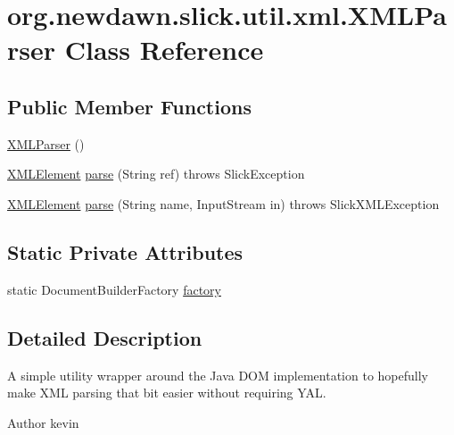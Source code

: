 \hypertarget{classorg_1_1newdawn_1_1slick_1_1util_1_1xml_1_1_x_m_l_parser}{}\section{org.\+newdawn.\+slick.\+util.\+xml.\+X\+M\+L\+Parser Class Reference}
\label{classorg_1_1newdawn_1_1slick_1_1util_1_1xml_1_1_x_m_l_parser}
\subsection*{Public Member Functions}
\begin{DoxyCompactItemize}
\item 
\mbox{\hyperlink{classorg_1_1newdawn_1_1slick_1_1util_1_1xml_1_1_x_m_l_parser_a560517a420b742fbdcef4565eb618f5c}{X\+M\+L\+Parser}} ()
\item 
\mbox{\hyperlink{classorg_1_1newdawn_1_1slick_1_1util_1_1xml_1_1_x_m_l_element}{X\+M\+L\+Element}} \mbox{\hyperlink{classorg_1_1newdawn_1_1slick_1_1util_1_1xml_1_1_x_m_l_parser_a24c99740f08e3fe6d427aa9b478a01ba}{parse}} (String ref)  throws Slick\+Exception 
\item 
\mbox{\hyperlink{classorg_1_1newdawn_1_1slick_1_1util_1_1xml_1_1_x_m_l_element}{X\+M\+L\+Element}} \mbox{\hyperlink{classorg_1_1newdawn_1_1slick_1_1util_1_1xml_1_1_x_m_l_parser_ad6cf0561a3b5afa18f67a670d8f335ae}{parse}} (String name, Input\+Stream in)  throws Slick\+X\+M\+L\+Exception 
\end{DoxyCompactItemize}
\subsection*{Static Private Attributes}
\begin{DoxyCompactItemize}
\item 
static Document\+Builder\+Factory \mbox{\hyperlink{classorg_1_1newdawn_1_1slick_1_1util_1_1xml_1_1_x_m_l_parser_add3e50cbc880252b74c5e60d886d32ac}{factory}}
\end{DoxyCompactItemize}


\subsection{Detailed Description}
A simple utility wrapper around the Java D\+OM implementation to hopefully make X\+ML parsing that bit easier without requiring Y\+AL.

\begin{DoxyAuthor}{Author}
kevin 
\end{DoxyAuthor}


